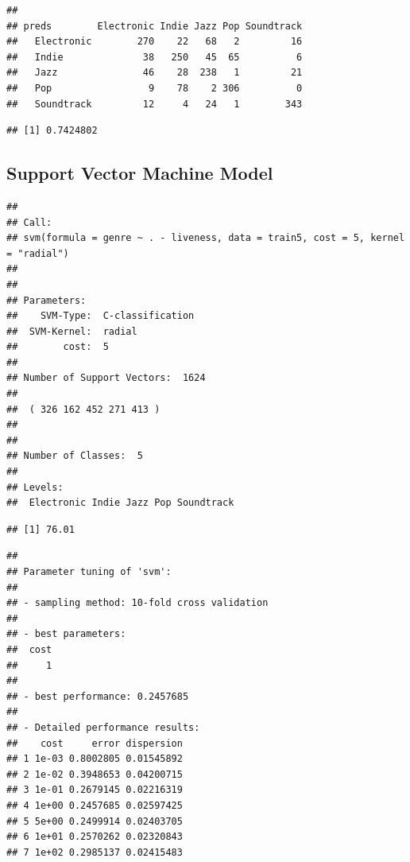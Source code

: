 \documentclass[
]{article}
\begin{document}
\begin{verbatim}
##             
## preds        Electronic Indie Jazz Pop Soundtrack
##   Electronic        270    22   68   2         16
##   Indie              38   250   45  65          6
##   Jazz               46    28  238   1         21
##   Pop                 9    78    2 306          0
##   Soundtrack         12     4   24   1        343
\end{verbatim}

\begin{verbatim}
## [1] 0.7424802
\end{verbatim}

\hypertarget{support-vector-machine-model}{%
\subsection{Support Vector Machine
Model}\label{support-vector-machine-model}}

\begin{verbatim}
## 
## Call:
## svm(formula = genre ~ . - liveness, data = train5, cost = 5, kernel = "radial")
## 
## 
## Parameters:
##    SVM-Type:  C-classification 
##  SVM-Kernel:  radial 
##        cost:  5 
## 
## Number of Support Vectors:  1624
## 
##  ( 326 162 452 271 413 )
## 
## 
## Number of Classes:  5 
## 
## Levels: 
##  Electronic Indie Jazz Pop Soundtrack
\end{verbatim}

\begin{verbatim}
## [1] 76.01
\end{verbatim}

\begin{verbatim}
## 
## Parameter tuning of 'svm':
## 
## - sampling method: 10-fold cross validation 
## 
## - best parameters:
##  cost
##     1
## 
## - best performance: 0.2457685 
## 
## - Detailed performance results:
##    cost     error dispersion
## 1 1e-03 0.8002805 0.01545892
## 2 1e-02 0.3948653 0.04200715
## 3 1e-01 0.2679145 0.02216319
## 4 1e+00 0.2457685 0.02597425
## 5 5e+00 0.2499914 0.02403705
## 6 1e+01 0.2570262 0.02320843
## 7 1e+02 0.2985137 0.02415483
\end{verbatim}
\end{document}
